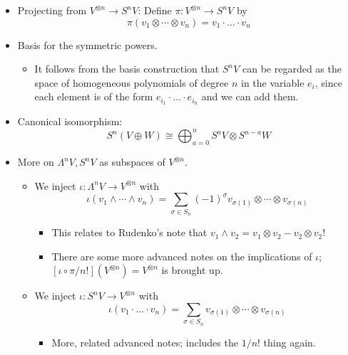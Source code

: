 \documentclass[../notes.tex]{subfiles}
\begin{document}
\begin{itemize}
\begin{itemize}
    \end{itemize}
    \item Projecting from $V^{\otimes n}\to S^nV$: Define $\pi:V^{\otimes n}\to S^nV$ by
    \begin{equation*}
        \pi(v_1\otimes\cdots\otimes v_n) = v_1\cdot\ldots\cdot v_n
    \end{equation*}
    \item Basis for the symmetric powers.
    \begin{itemize}
        \item It follows from the basis construction that $S^nV$ can be regarded as the space of homogeneous polynomials of degree $n$ in the variable $e_i$, since each element is of the form $e_{i_1}\cdot\ldots\cdot e_{i_n}$ and we can add them.
    \end{itemize}
    \item Canonical isomorphism:
    \begin{equation*}
        S^n(V\oplus W) \cong \bigoplus_{a=0}^nS^aV\otimes S^{n-a}W
    \end{equation*}
    \item More on $\Lambda^nV,S^nV$ as subspaces of $V^{\otimes n}$.
    \begin{itemize}
        \item We inject $\iota:\Lambda^nV\to V^{\otimes n}$ with
        \begin{equation*}
            \iota(v_1\wedge\cdots\wedge v_n) = \sum_{\sigma\in S_n}(-1)^\sigma v_{\sigma(1)}\otimes\cdots\otimes v_{\sigma(n)}
        \end{equation*}
        \begin{itemize}
            \item This relates to Rudenko's note that $v_1\wedge v_2=v_1\otimes v_2-v_2\otimes v_2$!
            \item There are some more advanced notes on the implications of $\iota$; $[\iota\circ\pi/n!](V^{\otimes n})=V^{\otimes n}$ is brought up.
        \end{itemize}
        \item We inject $\iota:S^nV\to V^{\otimes n}$ with
        \begin{equation*}
            \iota(v_1\cdot\ldots\cdot v_n) = \sum_{\sigma\in S_n}v_{\sigma(1)}\otimes\cdots\otimes v_{\sigma(n)}
        \end{equation*}
        \begin{itemize}
            \item More, related advanced notes; includes the $1/n!$ thing again.

\end{itemize}
\end{itemize}
\end{itemize}
\end{document}
